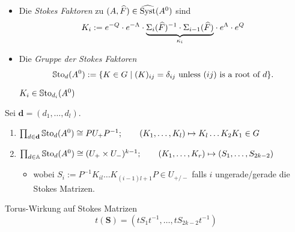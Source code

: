 \begin{defn}
  \begin{itemize}
    \item Die \emph{Stokes Faktoren} zu $(A,\widehat F)\in\widehat{\operatorname{Syst}}(A^0)$ sind
      \[
        K_i:= e^{-Q}\cdot e^{-\Lambda} \cdot \underset{\kappa_i}{\underbrace{%
          \Sigma_i(\hat F)^{-1}\cdot \Sigma_{i-1}(\hat F)}}
        \cdot  e^{\Lambda}\cdot e^{Q}
      \]
    \item Die \emph{Gruppe der Stokes Faktoren}
      \[
        \operatorname{\mathbb{S}to}_d(A^0) := \{K \in G \mid (K)_{ij}
          =\delta_{ij} \text{ unless } (ij) \text{ is a root of } d\}.
      \]
      \begin{lem}
        $K_i\in\operatorname{\mathbb{S}to}_{d_i}(A^0)$
      \end{lem}
  \end{itemize}
\end{defn}
\begin{lem}[3.2]
  Sei $\textbf{d}=(d_1,\dots,d_l)$.
  \begin{enumerate}
    \item $\prod_{d\in\textbf{d}}\operatorname{\mathbb{S}to}_d(A^0)\cong PU_+P^{-1};
      \qquad
      (K_1,\dots,K_l)\mapsto K_l\dots K_2K_1\in G$
    \item $\prod_{d\in\mathbb{A}}\operatorname{\mathbb{S}to}_d(A^0)\cong (U_+\times U_-)^{k-1};
      \qquad
      (K_1,\dots,K_r)\mapsto (S_1,\dots,S_{2k-2})$
      \begin{itemize}
        \item wobei $S_i:=P^{-1}K_{il}\dots K_{(i-1)l+1}P\in U_{+/-}$ falls $i$
          ungerade/gerade die Stokes Matrizen.
      \end{itemize}
  \end{enumerate}
\end{lem}
Torus-Wirkung auf Stokes Matrizen
\[
  t(\textbf{S})=(tS_1t^{-1},\dots,tS_{2k-2}t^{-1})
\]
